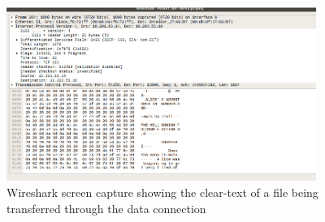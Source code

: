 \documentclass[journal, a4paper]{IEEEtran}
\begin{document}
\begin{figure}[hbtp!]
	\centering
	\includegraphics[width = 0.9\textwidth]{wireshark4}
	\caption{Wireshark screen capture showing the clear-text of a file being transferred through the data connection}
	\label{wireshark4}
\end{figure}
\end{document}
